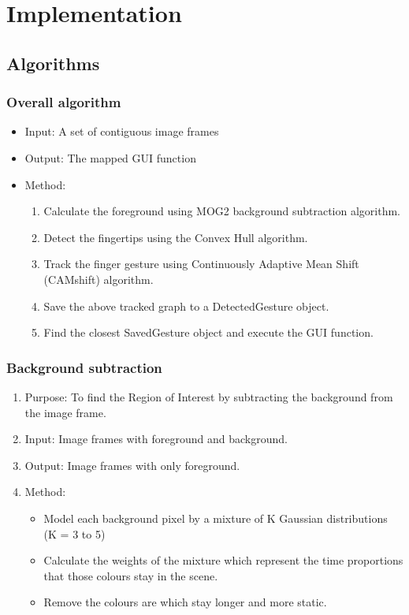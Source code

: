 \documentclass[11pt]{report}
\begin{document}
\chapter{Implementation}
\section{Algorithms}
\subsection{Overall algorithm}
\begin{itemize}
    \item Input: A set of contiguous image frames
    \item Output: The mapped GUI function
    \item Method:
    \begin{enumerate}
        \item Calculate the foreground using MOG2 background subtraction algorithm.
        \item Detect the fingertips using the Convex Hull algorithm.
        \item Track the finger gesture using Continuously Adaptive Mean Shift (CAMshift) algorithm.
        \item Save the above tracked graph to a DetectedGesture object.
        \item Find the closest SavedGesture object and execute the GUI function.
    \end{enumerate}
\end{itemize}
\subsection{Background subtraction}
\begin{enumerate}
    \item Purpose: To find the Region of Interest by subtracting the background from the image frame.
    \item Input: Image frames with foreground and background.
    \item Output: Image frames with only foreground. 
    \item Method:
    \begin{itemize}
        \item Model each background pixel by a mixture of K Gaussian distributions (K = 3 to 5)
        \item Calculate the weights of the mixture which represent the time proportions that those colours stay in the scene.
        \item Remove the colours are which stay longer and more static.
    \end{itemize}
\end{enumerate}
\end{document}
